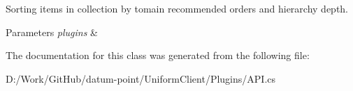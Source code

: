 Sorting items in collection by tomain recommended orders and hierarchy depth. 


\begin{DoxyParams}{Parameters}
{\em plugins} & \\
\hline
\end{DoxyParams}


The documentation for this class was generated from the following file\+:\begin{DoxyCompactItemize}
\item 
D\+:/\+Work/\+Git\+Hub/datum-\/point/\+Uniform\+Client/\+Plugins/A\+P\+I.\+cs\end{DoxyCompactItemize}
